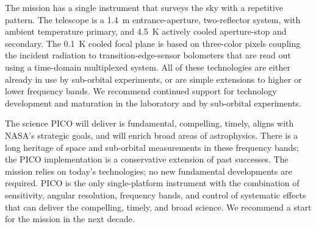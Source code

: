 \documentclass[PICOReport.tex]{subfiles}
\begin{document}

The mission has a single instrument that surveys the sky with a repetitive pattern.  The telescope is a 1.4~m entrance-aperture, two-reflector system, with ambient temperature primary, and 4.5~K actively cooled aperture-stop and secondary. The 0.1~K cooled focal plane is based on three-color pixels coupling the incident radiation to transition-edge-sensor bolometers that are read out using a time-domain multiplexed system. All of these technologies are either already in use by sub-orbital experiments, or are simple extensions to higher or lower frequency bands. We recommend continued support for technology development and maturation in the laboratory and by sub-orbital experiments. 

The science PICO will deliver is fundamental, compelling, timely, aligns with NASA's strategic goals, and will enrich broad areas of astrophysics. There is a long heritage of space and sub-orbital measurements in these frequency bands; the PICO implementation is a conservative extension of past successes. The mission relies on today's technologies; no new fundamental developments are required. PICO is the only single-platform instrument with the combination of sensitivity, angular resolution, frequency bands, and control of systematic effects that can deliver the compelling, timely, and broad science. We recommend a start for the mission in the next decade. 


\end{document}
